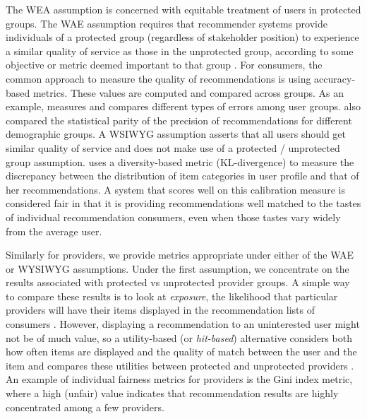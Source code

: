 The WEA assumption is concerned with equitable treatment of users in protected groups. The WAE assumption requires that recommender systems provide individuals of a protected group (regardless of stakeholder position) to experience a similar quality of service as those in the unprotected group, according to some objective or metric deemed important to that group \cite{ekstrand2018all,ekstrand2021exploring,steck2018calibrated,yao2017beyond}. For consumers, the common approach to measure the quality of recommendations is using accuracy-based metrics. These values are computed and compared across groups. As an example, \cite{yao2017beyond} measures and compares different types of errors among user groups. \cite{burke2018balanced} also compared the statistical parity of the precision of recommendations for different demographic groups. A WSIWYG assumption asserts that all users should get similar quality of service and does not make use of a protected / unprotected group assumption. \cite{steck2018calibrated} uses a diversity-based metric (KL-divergence) to measure the discrepancy between the distribution of item categories in user profile and that of her recommendations. A system that scores well on this calibration measure is considered fair in that it is providing recommendations well matched to the tastes of individual recommendation consumers, even when those tastes vary widely from the average user.

Similarly for providers, we provide metrics appropriate under either of the WAE or WYSIWYG assumptions. Under the first assumption, we concentrate on the results associated with protected vs unprotected provider groups. A simple way to compare these results is to look at \textit{exposure}, the likelihood that particular providers will have their items displayed in the recommendation lists of consumers \cite{liu2019farpfar,sonboli2020opportunistic}. However, displaying a recommendation to an uninterested user might not be of much value, so a utility-based (or \textit{hit-based}) alternative considers both how often items are displayed and the quality of match between the user and the item and compares these utilities between protected and unprotected providers \cite{singh2018fairness,biega2018equity}. An example of individual fairness metrics for providers is the Gini index metric, where a high (unfair) value indicates that recommendation results are highly concentrated among a few providers.

